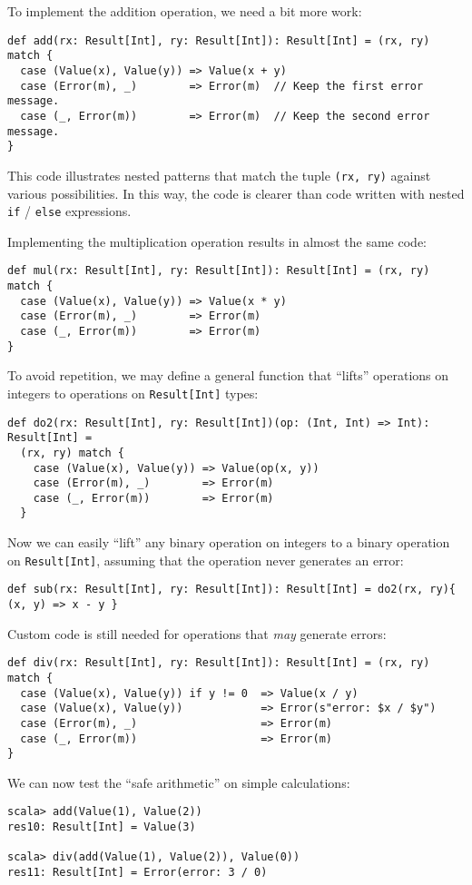 To implement the addition operation, we need a bit more work:
\begin{lstlisting}
def add(rx: Result[Int], ry: Result[Int]): Result[Int] = (rx, ry) match {
  case (Value(x), Value(y)) => Value(x + y)
  case (Error(m), _)        => Error(m)  // Keep the first error message.
  case (_, Error(m))        => Error(m)  // Keep the second error message.
}
\end{lstlisting}
This code illustrates nested patterns that match the tuple \lstinline!(rx, ry)!
against various possibilities. In this way, the code is clearer than
code written with nested \lstinline!if! / \lstinline!else! expressions.

Implementing the multiplication operation results in almost the same
code:
\begin{lstlisting}
def mul(rx: Result[Int], ry: Result[Int]): Result[Int] = (rx, ry) match {
  case (Value(x), Value(y)) => Value(x * y)
  case (Error(m), _)        => Error(m)
  case (_, Error(m))        => Error(m)
}
\end{lstlisting}
To avoid repetition, we may define a general function that \textsf{``}lifts\textsf{''}
operations on integers to operations on \lstinline!Result[Int]! types:
\begin{lstlisting}
def do2(rx: Result[Int], ry: Result[Int])(op: (Int, Int) => Int): Result[Int] =
  (rx, ry) match {
    case (Value(x), Value(y)) => Value(op(x, y))
    case (Error(m), _)        => Error(m)
    case (_, Error(m))        => Error(m)
  }
\end{lstlisting}
Now we can easily \textsf{``}lift\textsf{''} any binary operation on integers to a
binary operation on \lstinline!Result[Int]!, assuming that the operation
never generates an error:
\begin{lstlisting}
def sub(rx: Result[Int], ry: Result[Int]): Result[Int] = do2(rx, ry){ (x, y) => x - y }
\end{lstlisting}
 Custom code is still needed for operations that \emph{may} generate
errors:
\begin{lstlisting}
def div(rx: Result[Int], ry: Result[Int]): Result[Int] = (rx, ry) match {
  case (Value(x), Value(y)) if y != 0  => Value(x / y)
  case (Value(x), Value(y))            => Error(s"error: $x / $y")
  case (Error(m), _)                   => Error(m)
  case (_, Error(m))                   => Error(m)
}
\end{lstlisting}
We can now test the \textsf{``}safe arithmetic\textsf{''} on simple calculations:
\begin{lstlisting}
scala> add(Value(1), Value(2))
res10: Result[Int] = Value(3)

scala> div(add(Value(1), Value(2)), Value(0))
res11: Result[Int] = Error(error: 3 / 0)
\end{lstlisting}
